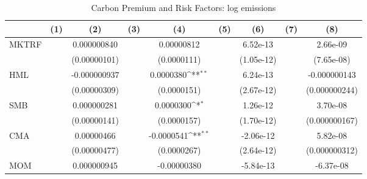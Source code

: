 \begin{table}[htbp]\centering
\def\sym#1{\ifmmode^{#1}\else\(^{#1}\)\fi}
\caption{Carbon Premium and Risk Factors: log emissions}
\begin{tabular}{l*{8}{c}}
\hline\hline
                    &\multicolumn{1}{c}{(1)}         &\multicolumn{1}{c}{(2)}         &\multicolumn{1}{c}{(3)}         &\multicolumn{1}{c}{(4)}         &\multicolumn{1}{c}{(5)}         &\multicolumn{1}{c}{(6)}         &\multicolumn{1}{c}{(7)}         &\multicolumn{1}{c}{(8)}         \\
\hline
MKTRF               &                     & 0.000000840         &                     &  0.00000812         &                     &    6.52e-13         &                     &    2.66e-09         \\
                    &                     &(0.00000101)         &                     & (0.0000111)         &                     &  (1.05e-12)         &                     &  (7.65e-08)         \\
[1em]
HML                 &                     &-0.000000937         &                     &   0.0000380\sym{**} &                     &    6.24e-13         &                     &-0.000000143         \\
                    &                     &(0.00000309)         &                     & (0.0000151)         &                     &  (2.67e-12)         &                     &(0.000000244)         \\
[1em]
SMB                 &                     & 0.000000281         &                     &   0.0000300\sym{*}  &                     &    1.26e-12         &                     &    3.70e-08         \\
                    &                     &(0.00000141)         &                     & (0.0000157)         &                     &  (1.70e-12)         &                     &(0.000000167)         \\
[1em]
CMA                 &                     &  0.00000466         &                     &  -0.0000541\sym{**} &                     &   -2.06e-12         &                     &    5.82e-08         \\
                    &                     &(0.00000477)         &                     & (0.0000267)         &                     &  (2.64e-12)         &                     &(0.000000312)         \\
[1em]
MOM                 &                     & 0.000000945         &                     & -0.00000380         &                     &   -5.84e-13         &                     &   -6.37e-08         \\

\end{tabular}
\end{table}
